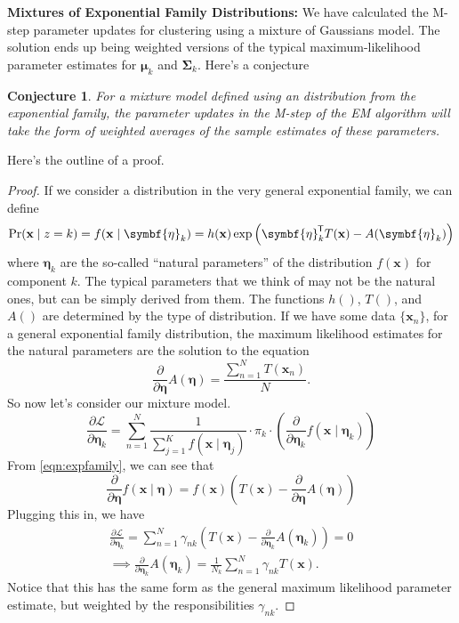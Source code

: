 \documentclass[11pt]{article}
\newtheorem*{conjecture}{Conjecture}
\newcommand{\xb}{\mathbf{x}}
\newcommand{\ub}{\symbf{\mu}}
\newcommand{\Sb}{\symbf{\Sigma}}
\newcommand*{\tran}{^{\mkern-1.5mu\mathsf{T}}}
\begin{document}
\textbf{Mixtures of Exponential Family Distributions:} We have calculated the
M-step parameter updates for clustering using a mixture of Gaussians model. The
solution ends up being weighted versions of the typical maximum-likelihood
parameter estimates for $\ub_k$ and $\Sb_k$. Here's a conjecture
\begin{conjecture}
  For a mixture model defined using an distribution from the exponential family,
  the parameter updates in the M-step of the EM algorithm will take the form
  of weighted averages of the sample estimates of these parameters.
\end{conjecture}
Here's the outline of a proof.
\begin{proof}
If we consider a distribution in the very general exponential family, we can
define
\begin{equation}
  \Pr(\xb \mid z = k) = f(\xb \mid \symbf{\eta}_k) = h(\xb)
      \exp \left(\symbf{\eta}_k\tran T(\xb) - A(\symbf{\eta}_k)\right)
  \label{eqn:expfamily}
\end{equation}
where $\symbf{\eta}_k$ are the so-called ``natural parameters'' of the
distribution $f(\xb)$ for component $k$. The typical parameters that we think of
may not be the natural ones, but can be simply derived from them. The functions
$h()$, $T()$, and $A()$ are determined by the type of distribution. If we have
some data $\{\xb_n\}$, for a general exponential family distribution, the
maximum likelihood estimates for the natural parameters are the solution to the
equation
\begin{equation*}
  \frac{\partial}{\partial \symbf{\eta}} A(\symbf{\eta}) = \frac{\sum_{n=1}^N T(\xb_n)}{N}.
\end{equation*}
So now let's consider our mixture model.
\begin{equation}
  \frac{\partial\mathcal{L}}{\partial\symbf{\eta}_k} = \sum_{n=1}^N
    \frac{1}{\sum_{j=1}^K f(\xb \mid \symbf{\eta}_j)}
    \cdot \pi_k \cdot \left(\frac{\partial}{\partial\symbf{\eta}_k}
                            f(\xb \mid \symbf{\eta}_k)\right)
\end{equation}
From \eqref{eqn:expfamily}, we can see that
\begin{equation*}
  \frac{\partial}{\partial\symbf{\eta}} f(\xb \mid \symbf{\eta}) =
  f(\xb) \left(T(\xb) - \frac{\partial}{\partial \symbf{\eta}}
    A(\symbf{\eta}) \right)
\end{equation*}
Plugging this in, we have
\begin{gather}
  \frac{\partial\mathcal{L}}{\partial\symbf{\eta}_k} = \sum_{n=1}^N
    \gamma_{nk} \left(T(\xb) - \frac{\partial}{\partial \symbf{\eta}_k}
      A(\symbf{\eta}_k) \right) = 0 \\
  \implies \frac{\partial}{\partial \symbf{\eta}_k} A(\symbf{\eta}_k) =
    \frac{1}{N_k} \sum_{n=1}^N \gamma_{nk} T(\xb).
\end{gather}
Notice that this has the same form as the general maximum likelihood parameter
estimate, but weighted by the responsibilities $\gamma_{nk}$.
\end{proof}
\end{document}
